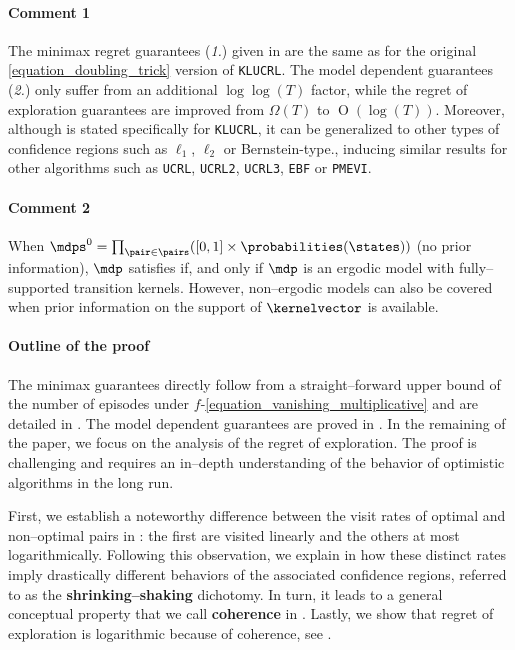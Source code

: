 \documentclass[preprint,cleveref,12pt]{colt2025}
\def\product{\prod}
\DeclareMathOperator*{\OH}{\mathrm{O}}
\def\model{\mdp}
\def\models{\mdps}
\def\kernel{\kernelvector}
\newcommand{\strong}[1]{\textbf{#1}}
\begin{document}
    \paragraph{Comment 1}
    The minimax regret guarantees (\textit{1.}) given in  are the same as for the original \eqref{equation_doubling_trick} version of \texttt{KLUCRL}.
    The model dependent guarantees (\textit{2.}) only suffer from an additional $\log \log(T)$ factor, while the regret of exploration guarantees are improved from $\Omega(T)$ to $\OH(\log(T))$.
    Moreover, although  is stated specifically for \texttt{KLUCRL}, it can be generalized to other types of confidence regions such as $\ell_1$, $\ell_2$ or Bernstein-type., inducing similar results for other algorithms such as \texttt{UCRL}, \texttt{UCRL2},  \texttt{UCRL3}, \texttt{EBF} or \texttt{PMEVI}.

    \paragraph{Comment 2}
    When $\models^0 = \product_{\pair \in \pairs} ([0, 1] \times \probabilities(\states))$ (no prior information), $\model$ satisfies  if, and only if $\model$ is an ergodic model with fully--supported transition kernels. 
    However, non--ergodic models can also be covered when prior information on the support of $\kernel$ is available.

    \medskip

    \paragraph{Outline of the proof}
    The minimax guarantees directly follow from a straight--forward upper bound of the number of episodes under $f$-\eqref{equation_vanishing_multiplicative} and are detailed in .
    The model dependent guarantees are proved in .
    In the remaining of the paper, we focus on the analysis of the regret of exploration.
    The proof is challenging and requires an in--depth understanding of the behavior of optimistic algorithms in the long run. 

    First, we establish a noteworthy difference between the visit rates of optimal and non--optimal pairs in : the first are visited linearly and the others at most logarithmically.
    Following this observation, we explain in  how these distinct rates imply drastically different behaviors of the associated confidence regions, referred to as the \strong{shrinking--shaking} dichotomy. 
    In turn, it leads to a general conceptual property that we call \strong{coherence} in .  
    Lastly, we show that regret of exploration is logarithmic because of coherence, see .
\end{document}
